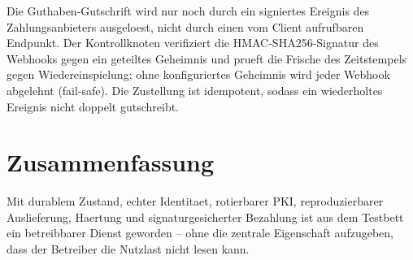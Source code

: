 Die Guthaben-Gutschrift wird nur noch durch ein signiertes Ereignis des
Zahlungsanbieters ausgeloest, nicht durch einen vom Client aufrufbaren
Endpunkt. Der Kontrollknoten verifiziert die HMAC-SHA256-Signatur des Webhooks
gegen ein geteiltes Geheimnis und prueft die Frische des Zeitstempels gegen
Wiedereinspielung; ohne konfiguriertes Geheimnis wird jeder Webhook abgelehnt
(fail-safe). Die Zustellung ist idempotent, sodass ein wiederholtes Ereignis
nicht doppelt gutschreibt.

\section{Zusammenfassung}
\label{sec:prod-fazit}

Mit durablem Zustand, echter Identitaet, rotierbarer PKI, reproduzierbarer
Auslieferung, Haertung und signaturgesicherter Bezahlung ist aus dem Testbett
ein betreibbarer Dienst geworden -- ohne die zentrale Eigenschaft aufzugeben,
dass der Betreiber die Nutzlast nicht lesen kann.
